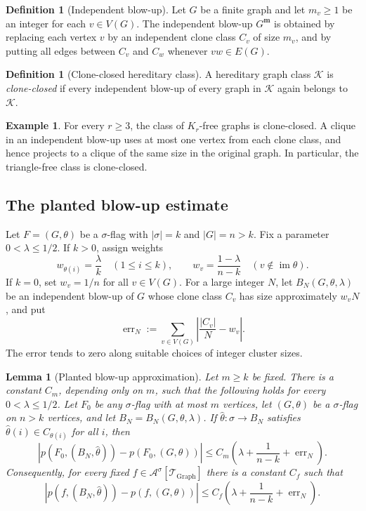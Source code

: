 \documentclass[11pt]{article}
\newtheorem{lemma}[theorem]{Lemma}
\theoremstyle{definition}
\newtheorem{definition}[theorem]{Definition}
\newtheorem{example}[theorem]{Example}
\newcommand{\A}{\mathcal{A}}
\newcommand{\K}{\mathcal{K}}
\newcommand{\T}{\mathcal{T}}
\begin{document}
\begin{definition}[Independent blow-up]
Let $G$ be a finite graph and let $m_v\ge1$ be an integer for each
$v\in V(G)$.  The independent blow-up $G^{\mathbf m}$ is obtained by replacing
each vertex $v$ by an independent clone class $C_v$ of size $m_v$, and by putting
all edges between $C_v$ and $C_w$ whenever $vw\in E(G)$.
\end{definition}

\begin{definition}[Clone-closed hereditary class]
A hereditary graph class $\K$ is \emph{clone-closed} if every independent
blow-up of every graph in $\K$ again belongs to $\K$.
\end{definition}

\begin{example}
For every $r\ge3$, the class of $K_r$-free graphs is clone-closed.  A clique in
an independent blow-up uses at most one vertex from each clone class, and hence
projects to a clique of the same size in the original graph.  In particular, the
triangle-free class is clone-closed.
\end{example}

\subsection{The planted blow-up estimate}

Let $F=(G,\theta)$ be a $\sigma$-flag with $|\sigma|=k$ and $|G|=n>k$.  Fix a
parameter $0<\lambda\le 1/2$.  If $k>0$, assign weights
\[
  w_{\theta(i)}=\frac{\lambda}{k}\quad(1\le i\le k),
  \qquad
  w_v=\frac{1-\lambda}{n-k}\quad(v\notin\operatorname{im}\theta).
\]
If $k=0$, set $w_v=1/n$ for all $v\in V(G)$.  For a large integer $N$, let
$B_N(G,\theta,\lambda)$ be an independent blow-up of $G$ whose clone class
$C_v$ has size approximately $w_vN$, and put
\[
  \operatorname{err}_N
  :=
  \sum_{v\in V(G)}\left|\frac{|C_v|}{N}-w_v\right|.
\]
The error tends to zero along suitable choices of integer cluster sizes.

\begin{lemma}[Planted blow-up approximation]\label{lem:planted-estimate}
Let $m\ge k$ be fixed.  There is a constant $C_m$, depending only on $m$, such
that the following holds for every $0<\lambda\le 1/2$.  Let $F_0$ be any $\sigma$-flag with at most $m$
vertices, let $(G,\theta)$ be a $\sigma$-flag on $n>k$ vertices, and let
$B_N=B_N(G,\theta,\lambda)$.  If
$\widehat\theta:\sigma\to B_N$ satisfies
$\widehat\theta(i)\in C_{\theta(i)}$ for all $i$, then
\begin{equation}\label{eq:planted-estimate}
  \left|p(F_0,(B_N,\widehat\theta))-p(F_0,(G,\theta))\right|
  \le
  C_m\left(\lambda+\frac1{n-k}+\operatorname{err}_N\right).
\end{equation}
Consequently, for every fixed $f\in\A^\sigma[\T_{\mathrm{Graph}}]$ there is a
constant $C_f$ such that
\begin{equation}\label{eq:planted-linear-estimate}
  \left|p(f,(B_N,\widehat\theta))-p(f,(G,\theta))\right|
  \le
  C_f\left(\lambda+\frac1{n-k}+\operatorname{err}_N\right).
\end{equation}
\end{lemma}
\end{document}
